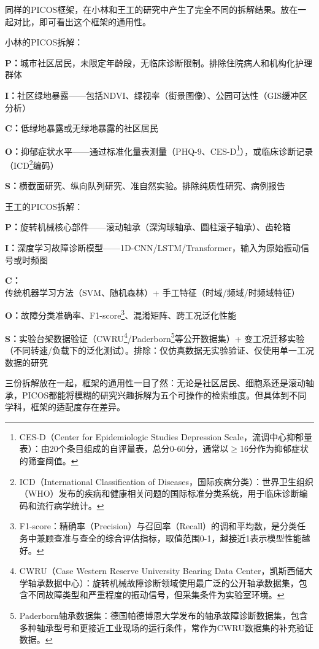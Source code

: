 \smallskip
同样的PICOS框架，在小林和王工的研究中产生了完全不同的拆解结果。放在一起对比，即可看出这个框架的通用性。

小林的PICOS拆解：

\smallskip
\noindent\textbf{P：}城市社区居民，未限定年龄段，无临床诊断限制。排除住院病人和机构化护理群体

\noindent\textbf{I：}社区绿地暴露——包括NDVI、绿视率（街景图像）、公园可达性（GIS缓冲区分析）

\noindent\textbf{C：}低绿地暴露或无绿地暴露的社区居民

\noindent\textbf{O：}抑郁症状水平——通过标准化量表测量（PHQ-9、CES-D\footnote{CES-D（Center for Epidemiologic Studies Depression Scale，流调中心抑郁量表）：由20个条目组成的自评量表，总分0-60分，通常以\(\geq\)16分作为抑郁症状的筛查阈值。}），或临床诊断记录（ICD\footnote{ICD（International Classification of Diseases，国际疾病分类）：世界卫生组织（WHO）发布的疾病和健康相关问题的国际标准分类系统，用于临床诊断编码和流行病学统计。}编码）

\noindent\textbf{S：}横截面研究、纵向队列研究、准自然实验。排除纯质性研究、病例报告
\smallskip

王工的PICOS拆解：

\smallskip
\noindent\textbf{P：}旋转机械核心部件——滚动轴承（深沟球轴承、圆柱滚子轴承）、齿轮箱

\noindent\textbf{I：}深度学习故障诊断模型——1D-CNN/LSTM/Transformer，输入为原始振动信号或时频图

\noindent\textbf{C：}传统机器学习方法（SVM、随机森林）+ 手工特征（时域/频域/时频域特征）

\noindent\textbf{O：}故障分类准确率、F1-score\footnote{F1-score：精确率（Precision）与召回率（Recall）的调和平均数，是分类任务中兼顾查准与查全的综合评估指标，取值范围0-1，越接近1表示模型性能越好。}、混淆矩阵、跨工况泛化性能

\noindent\textbf{S：}实验台架数据验证（CWRU\footnote{CWRU（Case Western Reserve University Bearing Data Center，凯斯西储大学轴承数据中心）：旋转机械故障诊断领域使用最广泛的公开轴承数据集，包含不同故障类型和严重程度的振动信号，但采集条件为实验室环境。}/Paderborn\footnote{Paderborn轴承数据集：德国帕德博恩大学发布的轴承故障诊断数据集，包含多种轴承型号和更接近工业现场的运行条件，常作为CWRU数据集的补充验证数据。}等公开数据集）+ 变工况迁移实验（不同转速/负载下的泛化测试）。排除：仅仿真数据无实验验证、仅使用单一工况数据的研究
\smallskip

三份拆解放在一起，框架的通用性一目了然：无论是社区居民、细胞系还是滚动轴承，PICOS都能将模糊的研究兴趣拆解为五个可操作的检索维度。但具体到不同学科，框架的适配度存在差异。

